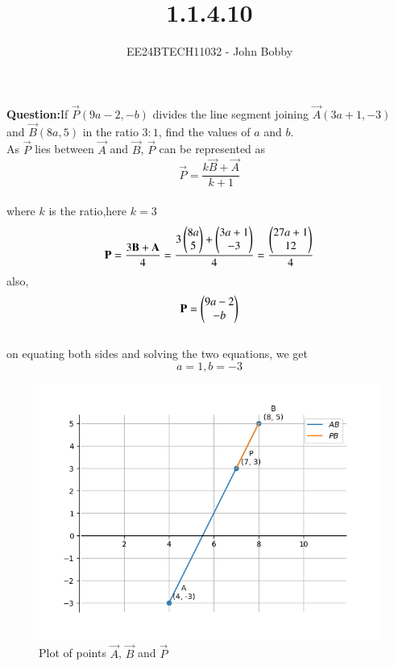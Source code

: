 \documentclass[journal]{IEEEtran}
\begin{document}

\vspace{3cm}
\title{1.1.4.10}
\author{EE24BTECH11032 - John Bobby
}
{\let\newpage\relax\maketitle}

\renewcommand{\thefigure}{\theenumi}
\renewcommand{\thetable}{\theenumi}
\setlength{\intextsep}{10pt} %


\renewcommand{\thetable}{\theenumi}
 \textbf{Question:}If $\vec{P}(9a-2,-b)$ divides the line segment joining $\vec{A}(3a+1,-3)$ and $\vec{B}(8a,5)$  
		in the ratio $3:1$, find the values of $a$ and $b$.\\
 
 \solution As $\vec{P}$ lies between $\vec{A}$ and $\vec{B}$, $\vec{P}$ can be represented as \\ 
		$$\vec{P}=\frac{k\vec{B}+\vec{A}}{k+1}$$ \\
		where $k$ is the ratio,here $k=3$\\
		$$\mathbf{P}=\frac{3\mathbf{B}+\mathbf{A}}{4}=\frac{3\begin{pmatrix}8a\\5\end{pmatrix}+\begin{pmatrix}3a+1\\-3\end{pmatrix}}{4}=\frac{\begin{pmatrix}27a+1\\12\end{pmatrix}}{4}$$
		also, $$\mathbf{P}=\begin{pmatrix}9a-2\\-b\end{pmatrix}$$\\
		on equating both sides and solving the two equations, we get \\
		$$a=1, b=-3$$
		\newpage


		\begin{figure}[h!]
                \centering
               \includegraphics[width=0.7\linewidth]{Figs/Fig1.png}
			\caption{Plot of points $\vec{A}$, $\vec{B}$ and $\vec{P}$}
               \label{stemplot}
               \end{figure}
\end{document}
